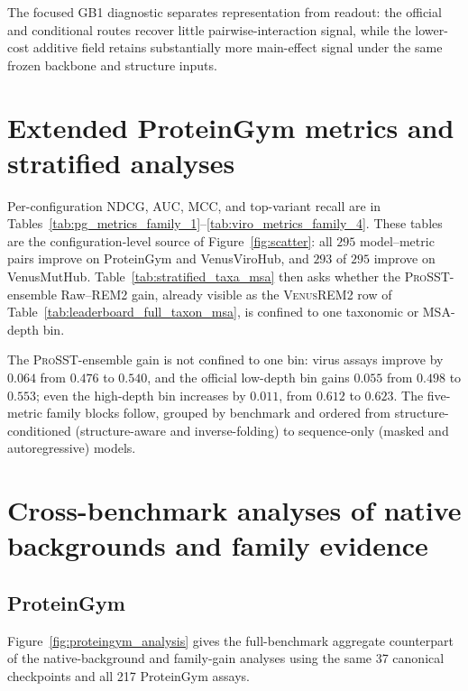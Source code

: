 \documentclass{article} %
\begin{document}
The focused GB1 diagnostic separates representation from readout: the official and conditional routes recover little pairwise-interaction signal, while the lower-cost additive field retains substantially more main-effect signal under the same frozen backbone and structure inputs.

\FloatBarrier
\section{Extended ProteinGym metrics and stratified analyses}
\label{app:extended_metrics}

Per-configuration NDCG, AUC, MCC, and top-variant recall are in Tables~\ref{tab:pg_metrics_family_1}--\ref{tab:viro_metrics_family_4}. These tables are the configuration-level source of Figure~\ref{fig:scatter}: all $295$ model--metric pairs improve on ProteinGym and VenusViroHub, and $293$ of $295$ improve on VenusMutHub. Table~\ref{tab:stratified_taxa_msa} then asks whether the \textsc{ProSST}-ensemble Raw--\textsc{REM2} gain, already visible as the \textsc{VenusREM2} row of Table~\ref{tab:leaderboard_full_taxon_msa}, is confined to one taxonomic or MSA-depth bin.



The \textsc{ProSST}-ensemble gain is not confined to one bin: virus assays improve by $0.064$ from $0.476$ to $0.540$, and the official low-depth bin gains $0.055$ from $0.498$ to $0.553$; even the high-depth bin increases by $0.011$, from $0.612$ to $0.623$. The five-metric family blocks follow, grouped by benchmark and ordered from structure-conditioned (structure-aware and inverse-folding) to sequence-only (masked and autoregressive) models.



\clearpage
\section{Cross-benchmark analyses of native backgrounds and family evidence}
\label{app:replications}

\subsection{ProteinGym}
\label{app:proteingym_replication}
Figure~\ref{fig:proteingym_analysis} gives the full-benchmark aggregate counterpart of the native-background and family-gain analyses using the same 37 canonical checkpoints and all 217 ProteinGym assays.
\end{document}
